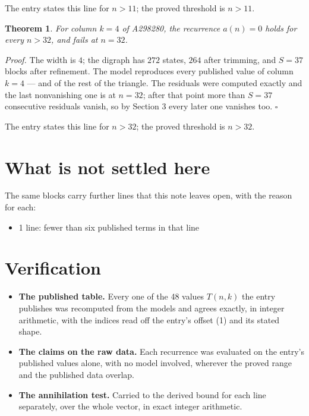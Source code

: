 \documentclass[11pt]{article}
\newtheorem{theorem}{Theorem}
\theoremstyle{definition}
\begin{document}
The entry states this line for $n > 11$; the proved threshold is $n > 11$.

\begin{theorem} For column $k = 4$ of A298280, the recurrence $a(n) = 0$ holds for every $n > 32$, and fails at $n = 32$.\end{theorem}

{\itshape Proof.} The width is $4$; the digraph has $272$ states, $264$ after trimming, and $S = 37$ blocks after refinement. The model reproduces every published value of column $k = 4$ --- and of the rest of the triangle. The residuals were computed exactly and the last nonvanishing one is at $n = 32$; after that point more than $S = 37$ consecutive residuals vanish, so by Section 3 every later one vanishes too. $\square$

The entry states this line for $n > 32$; the proved threshold is $n > 32$.

\section{What is not settled here}

The same blocks carry further lines that this note leaves open, with the reason for each:

\begin{itemize}

\item 1 line: fewer than six published terms in that line

\end{itemize}

\section{Verification}

\begin{itemize}

\item {\bfseries The published table.} Every one of the 48 values $T(n,k)$ the entry publishes was recomputed from the models and agrees exactly, in integer arithmetic, with the indices read off the entry's offset (1) and its stated shape.

\item {\bfseries The claims on the raw data.} Each recurrence was evaluated on the entry's published values alone, with no model involved, wherever the proved range and the published data overlap.

\item {\bfseries The annihilation test.} Carried to the derived bound for each line separately, over the whole vector, in exact integer arithmetic.

\end{itemize}
\end{document}
